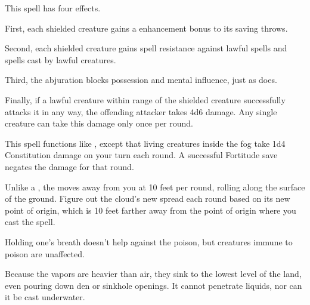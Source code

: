 \begin{spelleffect}
  This spell has four effects.
  \par First, each shielded creature gains a  enhancement bonus to its saving throws.
  \par Second, each shielded creature gains spell resistance against lawful spells and spells cast by lawful creatures.
  \par Third, the abjuration blocks possession and mental influence, just as  does.
  \par Finally, if a lawful creature within \rngmed range of the shielded creature successfully attacks it in any way, the offending attacker takes 4d6 damage. Any single creature can take this damage only once per round.
\end{spelleffect}

\begin{spelleffect}
  This spell functions like , except that living creatures inside the fog take 1d4 Constitution damage on your turn each round. A successful Fortitude save negates the damage for that round.
  \par Unlike a , the  moves away from you at 10 feet per round, rolling along the surface of the ground. Figure out the cloud's new spread each round based on its new point of origin, which is 10 feet farther away from the point of origin where you cast the spell.
\end{spelleffect}
\begin{spellnotes}
  Holding one's breath doesn't help against the poison, but creatures immune to poison are unaffected.
  \par Because the vapors are heavier than air, they sink to the lowest level of the land, even pouring down den or sinkhole openings. It cannot penetrate liquids, nor can it be cast underwater.
\end{spellnotes}

